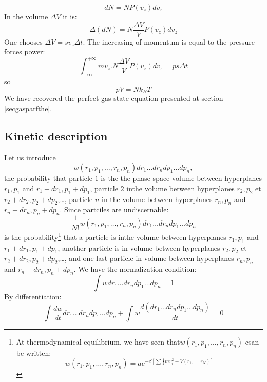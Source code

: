 \documentclass[12pt]{book}
\begin{document}
\begin{equation}
dN=NP(v_z)dv_z
\end{equation}
In the volume $\Delta V$ it is:
\begin{equation}
\Delta(dN)=N\frac{\Delta V}{V}P(v_z)dv_z
\end{equation}
One chooses $\Delta V =s v_z \Delta t$. The increasing of momentum is equal to
the pressure forces power:
\begin{equation}
\int_{-\infty}^{+\infty}m v_z.N\frac{\Delta V}{V}P(v_z)dv_z=p s \Delta t
\end{equation}
so
\begin{equation}
pV=Nk_BT
\end{equation}
We have recovered the perfect gas state equation presented at section
\ref{secgasparfthe}. 
\subsection{Kinetic description}\label{secdesccinet}
Let us introduce
\begin{equation}
w(r_1,p_1,\dots,r_n,p_n)dr_1\dots dr_n dp_1\dots dp_n,
\end{equation}
the probability that particle $1$ is the the phase space volume between
hyperplanes $r_1,p_1$ and $r_1 +dr_1,p_1+dp_1$, particle $2$ inthe volume
between hyperplanes $r_2,p_2$ et $r_2 +dr_2,p_2+dp_2$,\dots,
particle $n$ in the volume between hyperplanes $r_n,p_n$ and $r_n
+dr_n,p_n+dp_n$. Since partciles are undiscernable:
\begin{equation}
\frac{1}{N!}w(r_1,p_1,\dots,r_n,p_n)dr_1\dots dr_n dp_1\dots dp_n
\end{equation}
is the probability\footnote{At thermodynamical equilibrium, we have seen
  that$w(r_1,p_1,\dots,r_n,p_n)$ csan be written:
\begin{equation}
w(r_1,p_1,\dots,r_n,p_n)=ae^{-\beta[\sum
\frac{1}{2}mv_i^2+V(r_1,\dots,r_N)]} 
\end{equation}
}%
that a particle is inthe volume between hyperplanes $r_1,p_1$ and $r_1
+dr_1,p_1+dp_1$, another particle is in volume between hyperplanes $r_2,p_2$
et $r_2 +dr_2,p_2+dp_2$,\dots, and one last particle in volume between
hyperplanes $r_n,p_n$ and $r_n +dr_n,p_n+dp_n$. We have the normalization
condition: 
\begin{equation}
\int w dr_1\dots dr_n dp_1\dots dp_n=1
\end{equation}
By differentiation:
\begin{equation}
\int \frac{dw}{dt} dr_1\dots dr_n dp_1\dots dp_n+\int w\frac{d
(dr_1\dots dr_n dp_1\dots dp_n)}{dt}=0 
\end{equation}
\end{document}
